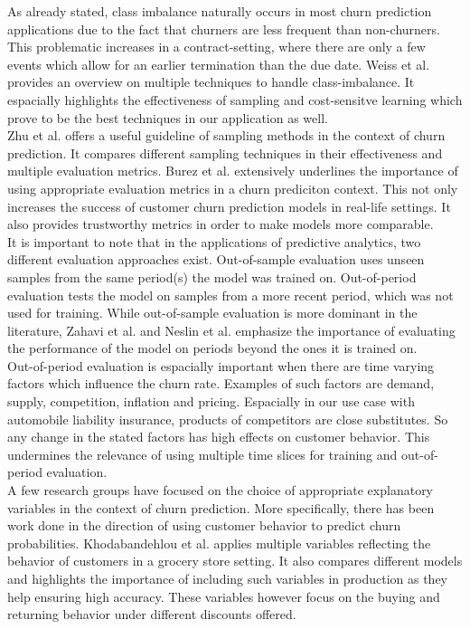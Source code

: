 \documentclass[12pt,titlepage]{article}
\begin{document}
As already stated, class imbalance naturally occurs in most churn prediction applications due to the fact that churners are less frequent than non-churners. This problematic increases in a contract-setting, where there are only a few events which allow for an earlier termination than the due date. Weiss et al. \cite{mining_rarity} provides an overview on multiple techniques to handle class-imbalance. It espacially highlights the effectiveness of sampling and cost-sensitve learning which prove to be the best techniques in our application as well. \\
Zhu et al. \cite{zhu} offers a useful guideline of sampling methods in the context of churn prediction. It compares different sampling techniques in their effectiveness and multiple evaluation metrics. Burez et al. \cite{burez} extensively underlines the importance of using appropriate evaluation metrics in a churn prediciton context. This not only increases the success of customer churn prediction models in real-life settings. It also provides trustworthy metrics in order to make models more comparable. \\
It is important to note that in the applications of predictive analytics, two different evaluation approaches exist. Out-of-sample evaluation uses unseen samples from the same period(s) the model was trained on. Out-of-period evaluation tests the model on samples from a more recent period, which was not used for training. While out-of-sample evaluation is more dominant in the literature, Zahavi et al. \cite{zahavi} and Neslin et al. \cite{neslin} emphasize the importance of evaluating the performance of the model on periods beyond the ones it is trained on. \\
Out-of-period evaluation is espacially important when there are time varying factors which influence the churn rate. Examples of such factors are demand, supply, competition, inflation and pricing. Espacially in our use case with automobile liability insurance, products of competitors are close substitutes. So any change in the stated factors has high effects on customer behavior. This undermines the relevance of using multiple time slices for training and out-of-period evaluation. \\
A few research groups have focused on the choice of appropriate explanatory variables in the context of churn prediction. More specifically, there has been work done in the direction of using customer behavior to predict churn probabilities. Khodabandehlou et al. \cite{khodabandehlou} applies multiple variables reflecting the behavior of customers in a grocery store setting. It also compares different models and highlights the importance of including such variables in production as they help ensuring high accuracy. These variables however focus on the buying and returning behavior under different discounts offered. \\
\end{document}
